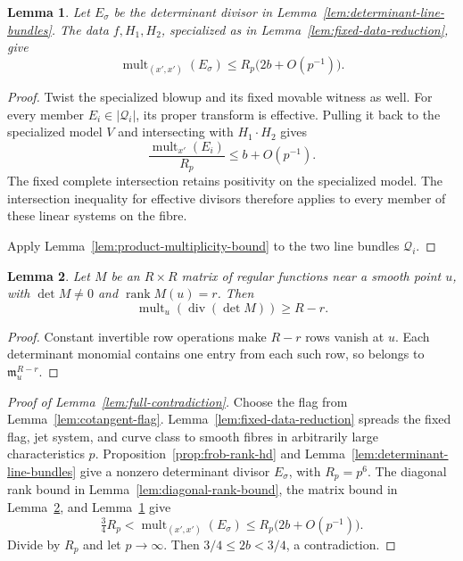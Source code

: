 \documentclass[12pt,a4paper,psamsfonts]{amsart}
\theoremstyle{definition}
\theoremstyle{plain}
\newtheorem{lemma}{Lemma}[section]
\newcommand{\mult}{\operatorname{mult}}
\begin{document}
\begin{lemma}\label{lem:determinant-upper-bound}
Let $E_\sigma$ be the determinant divisor in
Lemma~\ref{lem:determinant-line-bundles}. The data $f,H_1,H_2$,
specialized as in Lemma~\ref{lem:fixed-data-reduction}, give
\begin{equation}\label{eq:det-upper}
 \mult_{(x',x')}(E_\sigma)
 \le R_p\bigl(2b+O(p^{-1})\bigr).
\end{equation}
\end{lemma}
\begin{proof}
Twist the specialized blowup and its fixed movable witness as well.
For every member $E_i\in|\mathcal Q_i|$, its proper transform
is effective. Pulling it back to the specialized model $V$ and
intersecting with $H_1\cdot H_2$ gives
\[
 \frac{\mult_{x'}(E_i)}{R_p}\le b+O(p^{-1}).
\]
The fixed complete intersection retains positivity on the
specialized model. The intersection inequality for effective divisors
therefore applies to every member of these linear systems on the fibre.

Apply Lemma~\ref{lem:product-multiplicity-bound} to the two
line bundles $\mathcal Q_i$.
\end{proof}

\begin{lemma}\label{lem:matrix-multiplicity-bound}
Let $M$ be an $R\times R$ matrix of regular functions near a
smooth point $u$, with $\det M\ne0$ and $\operatorname{rank}M(u)=r$.
Then
\[
 \mult_u(\operatorname{div}(\det M))\ge R-r.
\]
\end{lemma}
\begin{proof}
Constant invertible row operations make $R-r$ rows vanish at $u$.
Each determinant monomial contains one entry from each such row,
so belongs to $\mathfrak m_u^{R-r}$.
\end{proof}



\begin{proof}[Proof of Lemma~\ref{lem:full-contradiction}]
Choose the flag from Lemma~\ref{lem:cotangent-flag}.
Lemma~\ref{lem:fixed-data-reduction} spreads the fixed flag,
jet system, and curve class to smooth fibres in arbitrarily
large characteristics $p$. Proposition~\ref{prop:frob-rank-hd}
and Lemma~\ref{lem:determinant-line-bundles} give a nonzero
determinant divisor $E_\sigma$, with $R_p=p^6$.
The diagonal rank bound in Lemma~\ref{lem:diagonal-rank-bound},
the matrix bound in Lemma~\ref{lem:matrix-multiplicity-bound},
and Lemma~\ref{lem:determinant-upper-bound} give
\begin{equation}\label{eq:det-lower}
 \tfrac34R_p<\mult_{(x',x')}(E_\sigma)
 \le R_p\bigl(2b+O(p^{-1})\bigr).
\end{equation}
Divide by $R_p$ and let $p\to\infty$. Then
$3/4\le2b<3/4$, a contradiction.
\end{proof}
\end{document}
